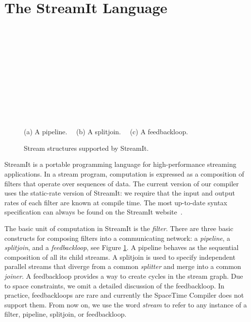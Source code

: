 \section{The StreamIt Language}
\label{sec:streamit}
\begin{figure}[t]
\begin{minipage}{3.2in}
\begin{center}
\begin{minipage}{0.46in}
\centering
{} \\
\end{minipage} 
~
\begin{minipage}{1.3in}
\centering
{} \\
\end{minipage}
~
\begin{minipage}{1.02in}
\centering
{} \\
\end{minipage} 
\\ ~ \\ {\protect\small (a) A pipeline. ~~(b) A splitjoin. ~~(c) A feedbackloop.}
\caption{Stream structures supported by StreamIt.
\protect\label{fig:structures}}
\end{center}
\end{minipage}
\end{figure}

StreamIt is a portable programming language for high-performance
streaming applications.  In a stream program, computation is expressed
as a composition of filters that operate over sequences of data. The
current version of our compiler uses the static-rate version of
StreamIt: we require that the input and output rates of each filter
are known at compile time.  The most up-to-date syntax specification
can always be found on the StreamIt website~\cite{streamitweb}.

The basic unit of computation in StreamIt is the {\it filter}.  There
are three basic constructs for composing filters into a communicating
network: a {\it pipeline}, a {\it splitjoin}, and a {\it
feedbackloop}, see Figure \ref{fig:structures}.  A pipeline behaves as
the sequential composition of all its child streams.  A splitjoin is
used to specify independent parallel streams that diverge from a
common {\it splitter} and merge into a common {\it joiner}. A
feedbackloop provides a way to create cycles in the stream graph.  Due
to space constraints, we omit a detailed discussion of the
feedbackloop. In practice, feedbackloops are rare and currently the
SpaceTime Compiler does not support them. From now on, we use the word
{\it stream} to refer to any instance of a filter, pipeline,
splitjoin, or feedbackloop.


